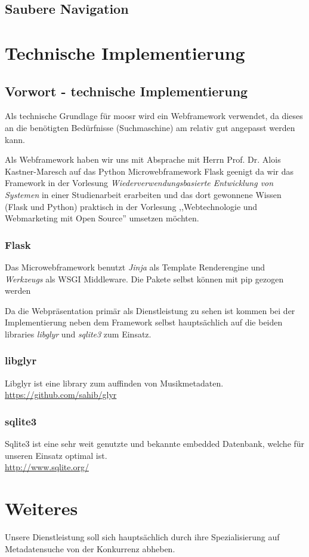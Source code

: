\documentclass[11pt]{scrreprt}
\begin{document}
\section{Saubere Navigation}


\chapter{Technische Implementierung}
\section{Vorwort - technische Implementierung}
Als technische Grundlage für moosr wird ein Webframework verwendet, da dieses an
die benötigten Bedürfnisse (Suchmaschine) am relativ gut angepasst werden kann.

Als Webframework haben wir uns mit Absprache mit Herrn Prof. Dr. Alois
Kastner-Maresch auf das Python Microwebframework Flask geenigt da wir das
Framework in der Vorlesung \emph{Wiederverwendungsbasierte Entwicklung von
Systemen} in einer Studienarbeit erarbeiten und das dort gewonnene Wissen (Flask
und Python) praktisch in der Vorlesung ,,Webtechnologie und Webmarketing 
mit Open Source'' umsetzen möchten.

\subsection{Flask}
Das Microwebframework benutzt \emph{Jinja} als Template Renderengine und
\emph{Werkzeugs} als WSGI Middleware. Die Pakete selbst können mit pip gezogen
werden


Da die Webpräsentation primär als Dienstleistung zu sehen ist kommen bei der
Implementierung neben dem Framework selbst hauptsächlich auf die beiden
libraries \emph{libglyr} und \emph{sqlite3} zum Einsatz.

\subsection{libglyr}
Libglyr ist eine library zum auffinden von Musikmetadaten. 
\\
    \url{https://github.com/sahib/glyr}


\subsection{sqlite3}
Sqlite3 ist eine sehr weit genutzte und bekannte embedded Datenbank, welche für
unseren Einsatz optimal ist.
\\
\url{http://www.sqlite.org/}

\chapter{Weiteres}
Unsere Dienstleistung soll sich hauptsächlich durch ihre Spezialisierung auf
Metadatensuche von der Konkurrenz abheben. 
\end{document}

